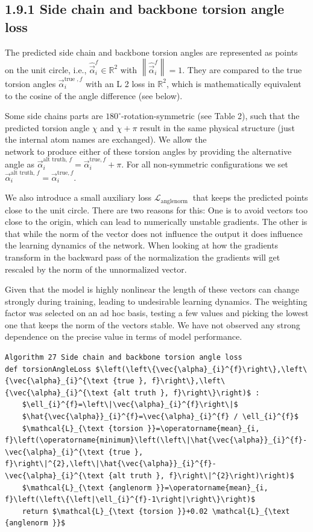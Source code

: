 \documentclass[10pt]{article}
\begin{document}
\subsection*{1.9.1 Side chain and backbone torsion angle loss}
The predicted side chain and backbone torsion angles are represented as points on the unit circle, i.e., $\hat{\vec{\alpha}}_{i}^{f} \in \mathbb{R}^{2}$ with $\left\|\hat{\vec{\alpha}}_{i}^{f}\right\|=1$. They are compared to the true torsion angles $\vec{\alpha}_{i}^{\text {true }, f}$ with an L 2 loss in $\mathbb{R}^{2}$, which is mathematically equivalent to the cosine of the angle difference (see below).

Some side chains parts are $180^{\circ}$-rotation-symmetric (see Table 2), such that the predicted torsion angle $\chi$ and $\chi+\pi$ result in the same physical structure (just the internal atom names are exchanged). We allow the\\
network to produce either of these torsion angles by providing the alternative angle as $\vec{\alpha}_{i}^{\mathrm{alt} \text { truth, } f}=\vec{\alpha}_{i}^{\mathrm{true}, f}+\pi$. For all non-symmetric configurations we set $\vec{\alpha}_{i}^{\mathrm{alt} \text { truth, } f}=\vec{\alpha}_{i}^{\mathrm{true}, f}$.

We also introduce a small auxiliary loss $\mathcal{L}_{\text {anglenorm }}$ that keeps the predicted points close to the unit circle. There are two reasons for this: One is to avoid vectors too close to the origin, which can lead to numerically unstable gradients. The other is that while the norm of the vector does not influence the output it does influence the learning dynamics of the network. When looking at how the gradients transform in the backward pass of the normalization the gradients will get rescaled by the norm of the unnormalized vector.

Given that the model is highly nonlinear the length of these vectors can change strongly during training, leading to undesirable learning dynamics. The weighting factor was selected on an ad hoc basis, testing a few values and picking the lowest one that keeps the norm of the vectors stable. We have not observed any strong dependence on the precise value in terms of model performance.

\begin{verbatim}
Algorithm 27 Side chain and backbone torsion angle loss
def torsionAngleLoss $\left(\left\{\vec{\alpha}_{i}^{f}\right\},\left\{\vec{\alpha}_{i}^{\text {true }, f}\right\},\left\{\vec{\alpha}_{i}^{\text {alt truth }, f}\right\}\right)$ :
    $\ell_{i}^{f}=\left\|\vec{\alpha}_{i}^{f}\right\|$
    $\hat{\vec{\alpha}}_{i}^{f}=\vec{\alpha}_{i}^{f} / \ell_{i}^{f}$
    $\mathcal{L}_{\text {torsion }}=\operatorname{mean}_{i, f}\left(\operatorname{minimum}\left(\left\|\hat{\vec{\alpha}}_{i}^{f}-\vec{\alpha}_{i}^{\text {true }, f}\right\|^{2},\left\|\hat{\vec{\alpha}}_{i}^{f}-\vec{\alpha}_{i}^{\text {alt truth }, f}\right\|^{2}\right)\right)$
    $\mathcal{L}_{\text {anglenorm }}=\operatorname{mean}_{i, f}\left(\left\{\left|\ell_{i}^{f}-1\right|\right\}\right)$
    return $\mathcal{L}_{\text {torsion }}+0.02 \mathcal{L}_{\text {anglenorm }}$
\end{verbatim}
\end{document}
